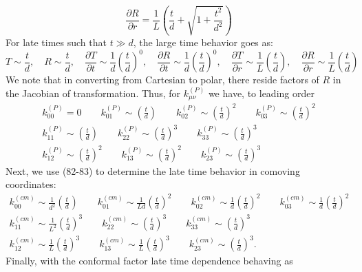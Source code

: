 \documentclass[10pt,letterpaper]{article}
\begin{document}
\begin{equation}
\frac{\partial R}{\partial r}= \frac1L \left( \frac{t}{d} + \sqrt{1+ \frac{t^2}{d^2}}\right)
\end{equation}
For late times such that $t\gg d$, the large time behavior goes as:
\begin{equation}
T \sim \frac{t}{d},\quad R \sim \frac{t}{d},
\quad \frac{\partial T}{\partial t} \sim \frac{1}{d}\left( \frac{t}{d} \right)^0,
\quad \frac{\partial R}{\partial t} \sim \frac{1}{d}\left( \frac{t}{d} \right)^0,
\quad \frac{\partial T}{\partial r} \sim\frac{1}{L}\left( \frac{t}{d} \right),
\quad \frac{\partial R}{\partial r} \sim\frac{1}{L}\left( \frac{t}{d} \right)
\end{equation}
We note that in converting from Cartesian to polar, there reside factors of $R$ in the Jacobian of transformation. Thus, for $k^{(P)}_{\mu\nu}$ we have, to leading order
\begin{align}
k^{(P)}_{00} = 0 \qquad 
k^{(P)}_{01} \sim \left( \frac{t}{d} \right) \qquad 
k^{(P)}_{02} \sim \left( \frac{t}{d} \right)^2 \qquad 
k^{(P)}_{03} \sim \left( \frac{t}{d} \right)^2 \nonumber \\
k^{(P)}_{11} \sim \left( \frac{t}{d} \right)\qquad 
k^{(P)}_{22} \sim \left( \frac{t}{d} \right)^3 \qquad 
k^{(P)}_{33} \sim \left( \frac{t}{d} \right)^3 \nonumber \\
k^{(P)}_{12} \sim \left( \frac{t}{d} \right)^2 \qquad 
k^{(P)}_{13} \sim \left( \frac{t}{d} \right)^2 \qquad 
k^{(P)}_{23} \sim \left( \frac{t}{d} \right)^3 
\end{align}
Next, we use (82-83) to determine the late time behavior in comoving coordinates:
\begin{align}
k^{(cm)}_{00} \sim  \frac{1}{d^2}\left( \frac{t}{d}^{} \right) \qquad 
k^{(cm)}_{01} \sim  \frac{1}{Ld}\left( \frac{t}{d} \right)^{2} \qquad 
k^{(cm)}_{02} \sim  \frac{1}{d}\left( \frac{t}{d} \right)^{2} \qquad 
k^{(cm)}_{03} \sim  \frac{1}{d}\left( \frac{t}{d} \right)^{2}   \nonumber\\
k^{(cm)}_{11} \sim  \frac{1}{L^2}\left( \frac{t}{d} \right)^{3} \qquad 
k^{(cm)}_{22} \sim  \left( \frac{t}{d} \right)^{3} \qquad 
k^{(cm)}_{33}  \sim  \left( \frac{t}{d} \right)^{3} \nonumber\\
k^{(cm)}_{12} \sim  \frac{1}{L}\left( \frac{t}{d} \right)^{3} \qquad 
k^{(cm)}_{13} \sim  \frac{1}{L}\left( \frac{t}{d} \right)^{3} \qquad  
k^{(cm)}_{23} \sim \left( \frac{t}{d} \right)^3 .
\end{align}
Finally, with the conformal factor late time dependence behaving as
\end{document}
